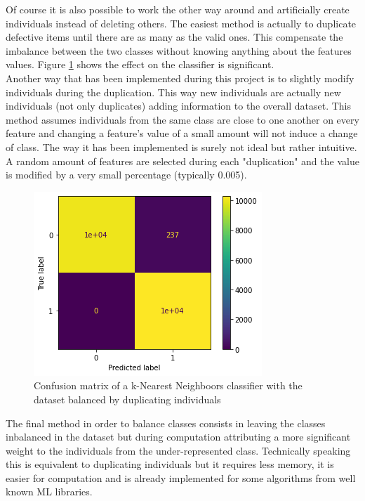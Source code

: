 Of course it is also possible to work the other way around and artificially create individuals instead of deleting others. The easiest method is actually to duplicate defective items until there are as many as the valid ones. This compensate the imbalance between the two classes without knowing anything about the features values. Figure \ref{data_preparation_3} shows the effect on the classifier is significant.\\
Another way that has been implemented during this project is to slightly modify individuals during the duplication. This way new individuals are actually new individuals (not only duplicates) adding information to the overall dataset. This method assumes individuals from the same class are close to one another on every feature and changing a feature's value of a small amount will not induce a change of class. The way it has been implemented is surely not ideal but rather intuitive. A random amount of features are selected during each "duplication" and the value is modified by a very small percentage (typically 0.005).\\

\begin{figure}
    \center
    \includegraphics[scale=.5]{img/data_preparation_3.png}
    \caption{Confusion matrix of a k-Nearest Neighboors classifier with the dataset balanced by duplicating individuals}
    \label{data_preparation_3}
\end{figure}

The final method in order to balance classes consists in leaving the classes inbalanced in the dataset but during computation attributing a more significant weight to the individuals from the under-represented class. Technically speaking this is equivalent to duplicating individuals but it requires less memory, it is easier for computation and is already implemented for some algorithms from well known ML libraries.  